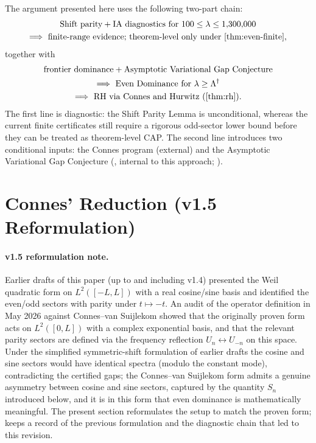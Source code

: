 \documentclass[11pt,a4paper]{article}
\theoremstyle{remark}
\theoremstyle{plain}
\begin{document}
The argument presented here uses the following two-part chain:
\[
\begin{gathered}
\text{Shift parity}+\text{IA diagnostics for }100\leq\lambda\leq 1{,}300{,}000\\
\Longrightarrow\ \text{finite-range evidence; theorem-level only under \Cref{thm:even-finite}},
\end{gathered}
\]
together with
\[
\begin{gathered}
\text{frontier dominance}+\text{Asymptotic Variational Gap Conjecture}\\
\Longrightarrow\ \text{Even Dominance for }\lambda\geq\Lambda^\dagger\\
\Longrightarrow\ \text{RH via Connes and Hurwitz (\Cref{thm:rh})}.
\end{gathered}
\]
The first line is diagnostic: the Shift Parity Lemma is unconditional, whereas
the current finite certificates still require a rigorous odd-sector lower bound
before they can be treated as theorem-level CAP. The second line introduces two
conditional inputs: the Connes program (external) and the Asymptotic Variational
Gap Conjecture (, internal to this approach;
).

\section{Connes' Reduction (v1.5 Reformulation)}

\paragraph{v1.5 reformulation note.}  Earlier drafts of this paper
(up to and including v1.4) presented the Weil quadratic form on
$L^2([-L,L])$ with a real cosine/sine basis and identified the
even/odd sectors with parity under $t\mapsto -t$.  An audit of the
operator definition in May 2026 against Connes--van Suijlekom
\cite{ConnesvS2025} showed that the originally proven form acts on
$L^2([0,L])$ with a complex exponential basis, and that the
relevant parity sectors are defined via the frequency reflection
$U_n\leftrightarrow U_{-n}$ on this space.  Under the simplified
symmetric-shift formulation of earlier drafts the cosine and sine
sectors would have identical spectra (modulo the constant mode),
contradicting the certified gaps; the Connes--van Suijlekom form
admits a genuine asymmetry between cosine and sine sectors,
captured by the quantity $S_n$ introduced below, and it is in this
form that even dominance is mathematically meaningful.  The
present section reformulates the setup to match the proven form;
 keeps a record of the previous
formulation and the diagnostic chain that led to this revision.
\end{document}
